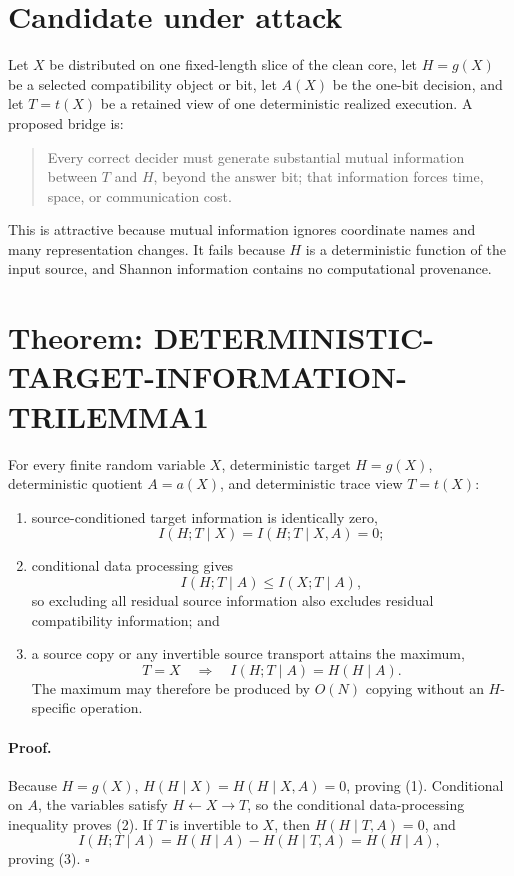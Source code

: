 \documentclass[11pt]{article}
\begin{document}
\section*{Candidate under attack}
Let $X$ be distributed on one fixed-length slice of the clean core, let
$H=g(X)$ be a selected compatibility object or bit, let $A(X)$ be the one-bit
decision, and let $T=t(X)$ be a retained view of one deterministic realized
execution.  A proposed bridge is:
\begin{quote}
Every correct decider must generate substantial mutual information between
$T$ and $H$, beyond the answer bit; that information forces time, space, or
communication cost.
\end{quote}
This is attractive because mutual information ignores coordinate names and
many representation changes.  It fails because $H$ is a deterministic
function of the input source, and Shannon information contains no
computational provenance.

\section*{Theorem: DETERMINISTIC-TARGET-INFORMATION-TRILEMMA1}
For every finite random variable $X$, deterministic target $H=g(X)$,
deterministic quotient $A=a(X)$, and deterministic trace view $T=t(X)$:
\begin{enumerate}
\item source-conditioned target information is identically zero,
\[
 I(H;T\mid X)=I(H;T\mid X,A)=0;
\]
\item conditional data processing gives
\[
 I(H;T\mid A)\le I(X;T\mid A),
\]
so excluding all residual source information also excludes residual
compatibility information; and
\item a source copy or any invertible source transport attains the maximum,
\[
 T=X\quad\Longrightarrow\quad
 I(H;T\mid A)=H(H\mid A).
\]
The maximum may therefore be produced by $O(N)$ copying without an
$H$-specific operation.
\end{enumerate}

\paragraph{Proof.}
Because $H=g(X)$, $H(H\mid X)=H(H\mid X,A)=0$, proving (1).  Conditional on
$A$, the variables satisfy $H\leftarrow X\rightarrow T$, so the conditional
data-processing inequality proves (2).  If $T$ is invertible to $X$, then
$H(H\mid T,A)=0$, and
\[
 I(H;T\mid A)=H(H\mid A)-H(H\mid T,A)=H(H\mid A),
\]
proving (3). \hfill$\square$
\end{document}
